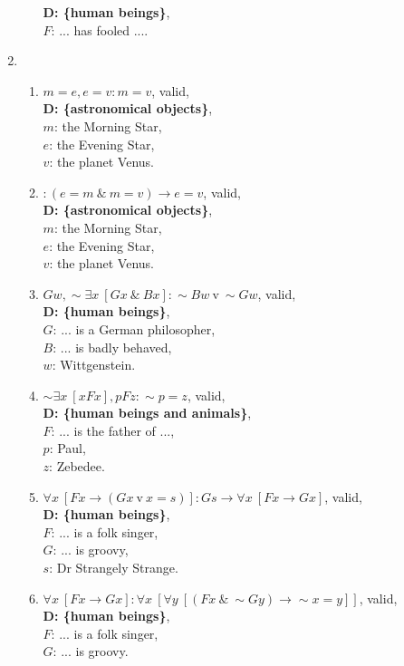 \documentclass[a4paper,12pt]{article}
\newcommand{\ra}{\rightarrow}
\newcommand{\s}{\sim}
\newcommand{\tv}{ \ \textrm{v} \ }
\newcommand{\ta}{ \ \& \ }
\newcommand{\all}{\forall}
\newcommand{\ex}{\exists}
\begin{document}
\begin{enumerate}[label=\arabic*,leftmargin=*]
\begin{enumerate}[label=(\roman*)]
                    \textbf{D: \{human beings\}},\\
                    $F$: ... has fooled ....
            \end{enumerate}
        \item
            \begin{enumerate}[label=(\roman*)]
                \item $m=e, e=v : m=v$, valid,\\
                    \textbf{D: \{astronomical objects\}},\\
                    $m$: the Morning Star,\\
                    $e$: the Evening Star,\\
                    $v$: the planet Venus.
                \item $: (e=m \ta m=v) \ra e=v$, valid,\\
                    \textbf{D: \{astronomical objects\}},\\
                    $m$: the Morning Star,\\
                    $e$: the Evening Star,\\
                    $v$: the planet Venus.
                \item $Gw, \s \ex x \ [Gx \ta Bx] : \s Bw \tv \s Gw$, valid,\\
                    \textbf{D: \{human beings\}},\\
                    $G$: ... is a German philosopher,\\
                    $B$: ... is badly behaved,\\
                    $w$: Wittgenstein.
                \item $\s \ex x \ [xFx], pFz : \s p=z$, valid,\\
                    \textbf{D: \{human beings and animals\}},\\
                    $F$: ... is the father of ...,\\
                    $p$: Paul,\\
                    $z$: Zebedee.
                \item $\all x \ [Fx \ra (Gx \tv x=s)] : Gs \ra \all x \ [Fx \ra Gx]$, valid,\\
                    \textbf{D: \{human beings\}},\\
                    $F$: ... is a folk singer,\\
                    $G$: ... is groovy,\\
                    $s$: Dr Strangely Strange.
                \item $\all x \ [Fx \ra Gx] : \all x \ [\all y \ [(Fx \ta \s Gy) \ra \s x=y]]$, valid,\\
                    \textbf{D: \{human beings\}},\\
                    $F$: ... is a folk singer,\\
                    $G$: ... is groovy.
            \end{enumerate}
    \end{enumerate}
\end{document}
